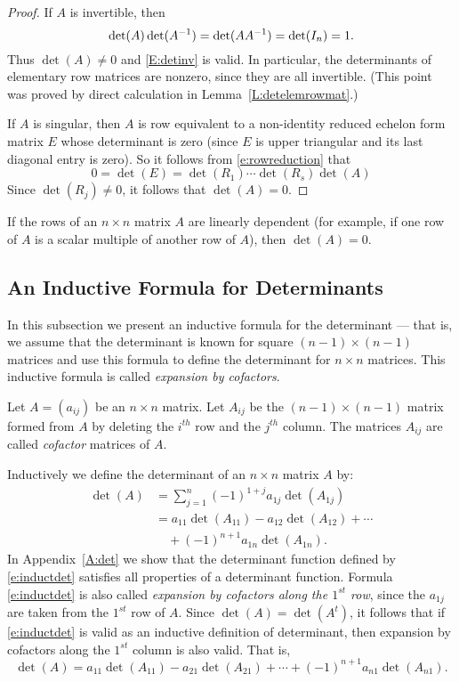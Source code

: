 \documentclass{ximera}
\begin{document}
\begin{proof}  If $A$ is invertible, then 
\[
\det(A)\det(A^{-1}) = \det(AA^{-1}) = \det(I_n) =1.
\]
Thus $\det(A)\neq 0$ and \eqref{E:detinv} is valid. In particular, the 
determinants of elementary row matrices are nonzero, since they are all
invertible. (This point was proved by direct calculation in
Lemma~\ref{L:detelemrowmat}.)
 
If $A$ is singular, then $A$ is row equivalent to a non-identity
reduced echelon form matrix $E$ whose determinant is zero (since
$E$ is upper triangular and its last diagonal entry is zero).
So it follows from
\eqref{e:rowreduction} that 
\[
0=\det(E) = \det(R_1)\cdots\det(R_s)\det(A)
\]
Since $\det(R_j)\neq 0$, it follows that $\det(A)=0$.  \end{proof}

\begin{corollary}
If the rows of an $n\times n$ matrix $A$ are linearly dependent (for example,
if one row of $A$ is a scalar multiple of another row of $A$), then 
$\det(A)=0$.
\end{corollary}


\subsection*{An Inductive Formula for Determinants} 
 
In this subsection we present an inductive formula for the
determinant --- that is, we assume that the determinant is known
for square $(n-1)\times(n-1)$ matrices and use this formula to
define the determinant for $n\times n$ matrices.  This inductive formula
is called {\em expansion by cofactors\/}.
 
Let $A=(a_{ij})$ be an $n\times n$ matrix.  Let $A_{ij}$ be the
$(n-1)\times(n-1)$ matrix formed from $A$ by deleting the
$i^{th}$ row and the $j^{th}$ column.  The matrices $A_{ij}$ are
called {\em cofactor\/}  matrices of $A$.  

Inductively we define the determinant of an $n\times n$ matrix $A$ by:
\begin{align}
\det(A) & = \sum^n_{j=1} (-1)^{1+j}a_{1j}\det(A_{1j}) \nonumber
\\  & = 
      a_{11}\det(A_{11})-a_{12}\det(A_{12})+\cdots \nonumber\\
  & \quad +(-1)^{n+1}a_{1n}\det(A_{1n}).
    \label{e:inductdet}
\end{align} 
In Appendix~\ref{A:det} we show that the determinant function defined by 
\eqref{e:inductdet} satisfies all properties of a determinant function.
Formula \eqref{e:inductdet} is also called {\em expansion by cofactors along 
the $1^{st}$ row\/}, since the $a_{1j}$ are taken from the $1^{st}$ row 
of $A$.  Since $\det(A)=\det(A^t)$, it follows that if \eqref{e:inductdet} is 
valid as an inductive definition of determinant, then expansion by cofactors 
along the $1^{st}$ column is also valid.  That is,
\begin{equation}  \label{e:inductdetc}
\det(A) = 
a_{11}\det(A_{11})-a_{21}\det(A_{21})+\cdots+(-1)^{n+1}a_{n1}\det(A_{n1}).
\end{equation} 
\end{document}
